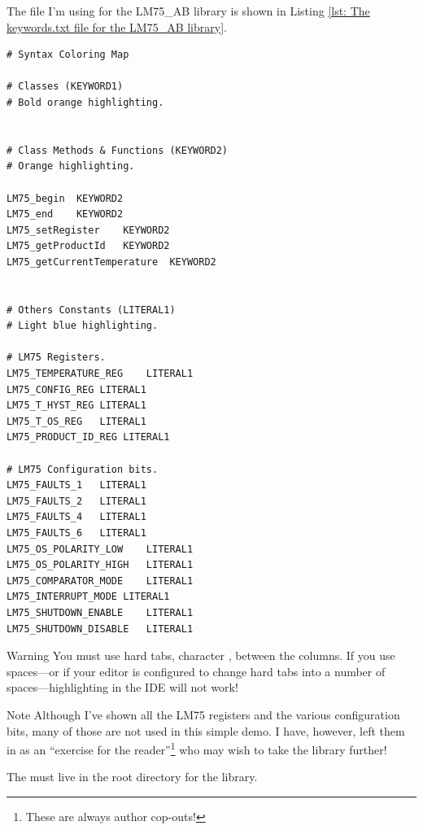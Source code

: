 The  file I'm using for the LM75\_AB library is shown in Listing \ref{lst: The keywords.txt file for the LM75_AB library}.

\begin{lstlisting}[caption={The \texttt{keywords.txt} file for the LM75\_AB library.},label={lst: The keywords.txt file for the LM75_AB library}]
# Syntax Coloring Map

# Classes (KEYWORD1)
# Bold orange highlighting.


# Class Methods & Functions (KEYWORD2)
# Orange highlighting.

LM75_begin	KEYWORD2
LM75_end	KEYWORD2
LM75_setRegister	KEYWORD2
LM75_getProductId	KEYWORD2
LM75_getCurrentTemperature	KEYWORD2


# Others Constants (LITERAL1)
# Light blue highlighting.

# LM75 Registers.
LM75_TEMPERATURE_REG	LITERAL1
LM75_CONFIG_REG	LITERAL1
LM75_T_HYST_REG	LITERAL1
LM75_T_OS_REG 	LITERAL1
LM75_PRODUCT_ID_REG	LITERAL1

# LM75 Configuration bits.
LM75_FAULTS_1	LITERAL1
LM75_FAULTS_2	LITERAL1
LM75_FAULTS_4	LITERAL1
LM75_FAULTS_6	LITERAL1
LM75_OS_POLARITY_LOW	LITERAL1
LM75_OS_POLARITY_HIGH	LITERAL1
LM75_COMPARATOR_MODE	LITERAL1
LM75_INTERRUPT_MODE	LITERAL1
LM75_SHUTDOWN_ENABLE	LITERAL1
LM75_SHUTDOWN_DISABLE	LITERAL1
\end{lstlisting}

\begin{tips}{Warning}
    You must use hard tabs, character , between the columns. If you use spaces---or if your editor is configured to change hard tabs into a number of spaces---highlighting in the IDE will not work!
\end{tips}

\begin{tips}{Note}
    Although I've shown all the LM75 registers and the various configuration bits, many of those are not used in this simple demo. I have, however, left them in as an ``exercise for the reader''\footnote{These are always author cop-outs!} who may wish to take the library further!
\end{tips}

The  must live in the root directory for the library.